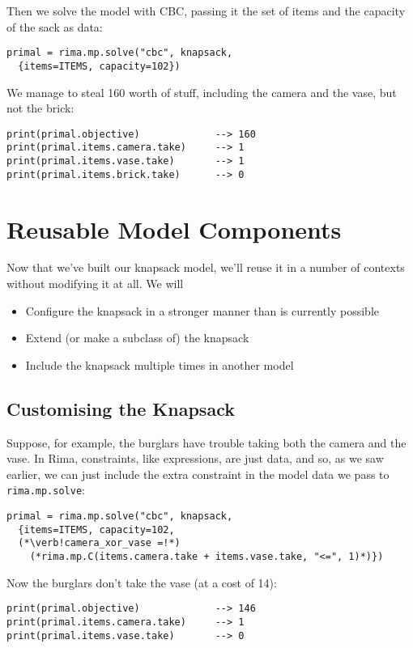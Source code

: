 \documentclass[a4paper,12pt]{article}
\begin{document}
Then we solve the model with CBC, passing it the set of items and the capacity of the sack as data:
  \begin{lstlisting}
primal = rima.mp.solve("cbc", knapsack,
  {items=ITEMS, capacity=102})
  \end{lstlisting}

We manage to steal 160 worth of stuff,
including the camera and the vase, but not the brick:
  \begin{lstlisting}
print(primal.objective)             --> 160
print(primal.items.camera.take)     --> 1
print(primal.items.vase.take)       --> 1
print(primal.items.brick.take)      --> 0
  \end{lstlisting}



\section{Reusable Model Components}

Now that we've built our knapsack model,
we'll reuse it in a number of contexts without modifying it at all.
We will
  \begin{itemize}
    \item Configure the knapsack in a stronger manner than is currently possible
    \item Extend (or make a subclass of) the knapsack
    \item Include the knapsack multiple times in another model
 \end{itemize}

\subsection{Customising the Knapsack}
Suppose, for example, the burglars have trouble taking both the camera and the vase.
In Rima, constraints, like expressions, are just data, and so,
as we saw earlier, we can just include the extra constraint in the model data we pass to 
\lstinline!rima.mp.solve!:
  \begin{lstlisting}
primal = rima.mp.solve("cbc", knapsack,
  {items=ITEMS, capacity=102,
  (*\verb!camera_xor_vase =!*)
    (*rima.mp.C(items.camera.take + items.vase.take, "<=", 1)*)})
  \end{lstlisting}

Now the burglars don't take the vase (at a cost of 14):
  \begin{lstlisting}
print(primal.objective)             --> 146
print(primal.items.camera.take)     --> 1
print(primal.items.vase.take)       --> 0
  \end{lstlisting}
\end{document}
